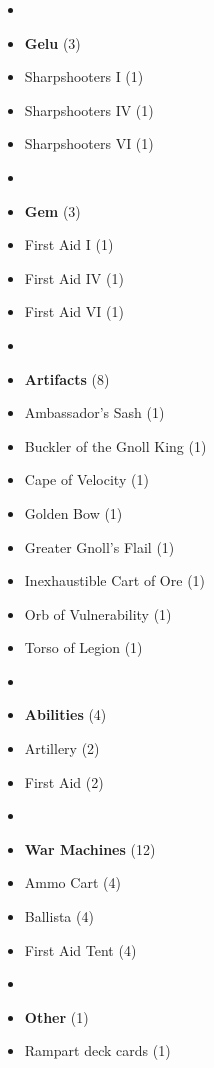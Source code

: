 \begin{multicols*}{3}
\begin{itemize}[leftmargin=0pt, label={}, noitemsep]
  \item
  \item \textbf{Gelu} (3)
  \item Sharpshooters I (1)
  \item Sharpshooters IV (1)
  \item Sharpshooters VI (1)
  \item
  \item \textbf{Gem} (3)
  \item First Aid I (1)
  \item First Aid IV (1)
  \item First Aid VI (1)
  \item
  \item \textbf{Artifacts} (8)
  \item Ambassador's Sash (1)
  \item Buckler of the Gnoll King (1)
  \item Cape of Velocity (1)
  \item Golden Bow (1)
  \item Greater Gnoll's Flail (1)
  \item Inexhaustible Cart of Ore (1)
  \item Orb of Vulnerability (1)
  \item Torso of Legion (1)
  \item
  \item \textbf{Abilities} (4)
  \item Artillery (2)
  \item First Aid (2)
  \item
  \item \textbf{War Machines} (12)
  \item Ammo Cart (4)
  \item Ballista (4)
  \item First Aid Tent (4)
  \item
  \item \textbf{Other} (1)
  \item Rampart deck cards (1)
\end{itemize}

\end{multicols*}
